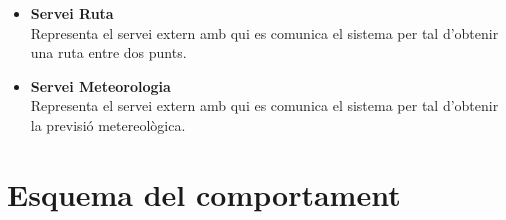 \begin{itemize}
\item[]\textbf{Servei Ruta}\\
Representa el servei extern amb qui es comunica el sistema per tal d'obtenir una ruta entre dos punts.

\item[]\textbf{Servei Meteorologia}\\
Representa el servei extern amb qui es comunica el sistema per tal d'obtenir la previsió metereològica.



\end{itemize}

\section{Esquema del comportament}

